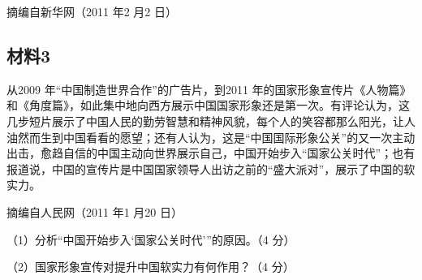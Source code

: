 \documentclass[UTF8,11pt]{ctexart}
\begin{document}
摘编自新华网（2011 年2 月2 日）

\subsection*{材料3}

从2009 年“中国制造世界合作”的广告片，到2011 年的国家形象宣传片《人物篇》和《角度篇》，如此集中地向西方展示中国国家形象还是第一次。有评论认为，这几步短片展示了中国人民的勤劳智慧和精神风貌，每个人的笑容都那么阳光，让人油然而生到中国看看的愿望；还有人认为，这是“中国国际形象公关”的又一次主动出击，愈趋自信的中国主动向世界展示自己，中国开始步入“国家公关时代”；也有报道说，中国的宣传片是中国国家领导人出访之前的“盛大派对”，展示了中国的软实力。

摘编自人民网（2011 年1 月20 日）

（1）分析“中国开始步入‘国家公关时代’”的原因。（4 分）


（2）国家形象宣传对提升中国软实力有何作用？（4 分）
\end{document}
